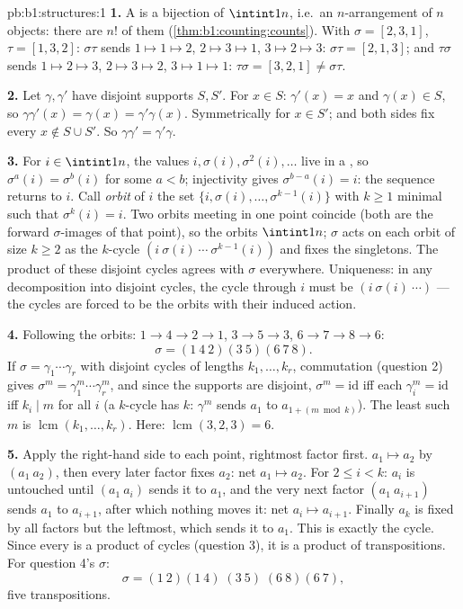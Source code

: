 \begin{solution}{pb:b1:structures:1}
\textbf{1.} A  is a bijection of $\intint1n$, i.e.\ an
$n$-arrangement of $n$ objects: there are $n!$ of them
(\cref{thm:b1:counting:counts}). With $\sigma = [2,3,1]$, $\tau =
[1,3,2]$: $\sigma\tau$ sends $1 \mapsto 1 \mapsto 2$, $2 \mapsto 3
\mapsto 1$, $3 \mapsto 2 \mapsto 3$: $\sigma\tau = [2,1,3]$; and
$\tau\sigma$ sends $1 \mapsto 2 \mapsto 3$, $2 \mapsto 3 \mapsto
2$, $3 \mapsto 1 \mapsto 1$: $\tau\sigma = [3,2,1] \neq
\sigma\tau$.

\textbf{2.} Let $\gamma, \gamma'$ have disjoint supports $S, S'$.
For $x \in S$: $\gamma'(x) = x$ and $\gamma(x) \in S$, so
$\gamma\gamma'(x) = \gamma(x) = \gamma'\gamma(x)$. Symmetrically
for $x \in S'$; and both sides fix every $x \notin S \cup S'$. So
$\gamma\gamma' = \gamma'\gamma$.

\textbf{3.} For $i \in \intint1n$, the values $i, \sigma(i),
\sigma^2(i), \dots$ live in a , so $\sigma^a(i) =
\sigma^b(i)$ for some $a < b$; injectivity gives $\sigma^{b-a}(i)
= i$: the sequence returns to $i$. Call \emph{orbit} of $i$ the
set $\{i, \sigma(i), \dots, \sigma^{k-1}(i)\}$ with $k \geq 1$
minimal such that $\sigma^k(i) = i$. Two orbits meeting in one
point coincide (both are the forward $\sigma$-images of that
point), so the orbits  $\intint1n$; $\sigma$ acts on each
orbit of size $k \geq 2$ as the $k$-cycle $(i\ \sigma(i)\ \cdots\
\sigma^{k-1}(i))$ and fixes the singletons. The product of these
disjoint cycles agrees with $\sigma$ everywhere. Uniqueness: in
any decomposition into disjoint cycles, the cycle through $i$ must
be $(i\ \sigma(i)\ \cdots)$ --- the cycles are forced to be the
orbits with their induced action.

\textbf{4.} Following the orbits: $1 \to 4 \to 2 \to 1$, $3 \to 5
\to 3$, $6 \to 7 \to 8 \to 6$:
\[
\sigma = (1\ 4\ 2)(3\ 5)(6\ 7\ 8) .
\]
If $\sigma = \gamma_1\cdots\gamma_r$ with disjoint cycles of
lengths $k_1, \dots, k_r$, commutation (question 2) gives
$\sigma^m = \gamma_1^m\cdots\gamma_r^m$, and since the supports
are disjoint, $\sigma^m = \mathrm{id}$ iff each $\gamma_i^m =
\mathrm{id}$ iff $k_i \mid m$ for all $i$ (a $k$-cycle has 
$k$: $\gamma^m$ sends $a_1$ to $a_{1 + (m \bmod k)}$). The least
such $m$ is $\operatorname{lcm}(k_1, \dots, k_r)$. Here:
$\operatorname{lcm}(3, 2, 3) = 6$.

\textbf{5.} Apply the right-hand side to each point, rightmost
factor first. $a_1 \mapsto a_2$ by $(a_1\ a_2)$, then every later
factor fixes $a_2$: net $a_1 \mapsto a_2$. For $2 \leq i < k$:
$a_i$ is untouched until $(a_1\ a_i)$ sends it to $a_1$, and the
very next factor $(a_1\ a_{i+1})$ sends $a_1$ to $a_{i+1}$, after
which nothing moves it: net $a_i \mapsto a_{i+1}$. Finally $a_k$
is fixed by all factors but the leftmost, which sends it to $a_1$.
This is exactly the cycle. Since every  is a product of
cycles (question 3), it is a product of transpositions. For
question 4's $\sigma$:
\[
\sigma = (1\ 2)(1\ 4)\;(3\ 5)\;(6\ 8)(6\ 7),
\]
five transpositions.


\end{solution}
